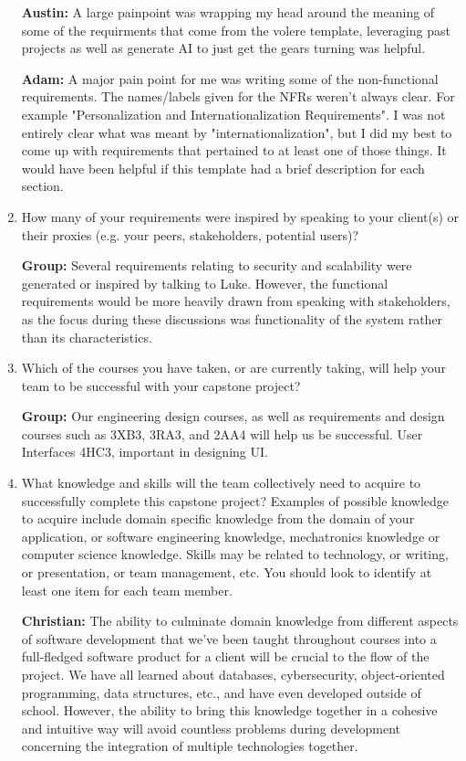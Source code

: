 \documentclass[12pt]{article}
\begin{document}
\begin{enumerate}
  \textbf{Austin: } A large painpoint was wrapping my head around the meaning of some of the requirments that come from the volere template, leveraging past projects as well as generate AI to just get the gears turning was helpful.

  \textbf{Adam:} A major pain point for me was writing some of the non-functional requirements. The names/labels given for the NFRs weren't always clear. For example "Personalization and Internationalization Requirements". I was not entirely clear what was meant by "internationalization", but I did my best to come up with requirements that pertained to at least one of those things. It would have been helpful if this template had a brief description for each section.

  \item How many of your requirements were inspired by speaking to your
  client(s) or their proxies (e.g. your peers, stakeholders, potential users)?

  \textbf{Group:} Several requirements relating to security and scalability were generated or inspired by talking to Luke. However, the functional requirements would be more heavily drawn from speaking with stakeholders, as the focus during these discussions was functionality of the system rather than its characteristics.

  \item Which of the courses you have taken, or are currently taking, will help your team to be successful with your capstone project?
  
  \textbf{Group:} Our engineering design courses, as well as requirements and design courses such as 3XB3, 3RA3, and 2AA4 will help us be successful. User Interfaces 4HC3, important in designing UI.

  \item What knowledge and skills will the team collectively need to acquire to
  successfully complete this capstone project?  Examples of possible knowledge
  to acquire include domain specific knowledge from the domain of your
  application, or software engineering knowledge, mechatronics knowledge or
  computer science knowledge.  Skills may be related to technology, or writing,
  or presentation, or team management, etc.  You should look to identify at
  least one item for each team member.

  \textbf{Christian:} The ability to culminate domain knowledge from different aspects of software development that we’ve been taught throughout courses into a full-fledged software product for a client will be crucial to the flow of the project. We have all learned about databases, cybersecurity, object-oriented programming, data structures, etc., and have even developed outside of school. However, the ability to bring this knowledge together in a cohesive and intuitive way will avoid countless problems during development concerning the integration of multiple technologies together.


\end{enumerate}
\end{document}
